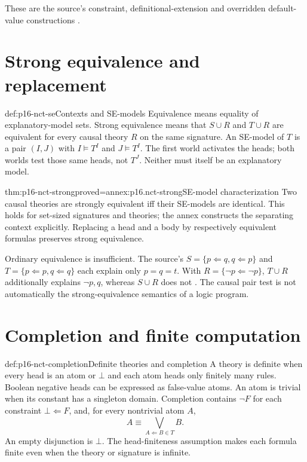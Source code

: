 These are the source's constraint, definitional-extension and overridden
default-value constructions \cite[pp.~763--765]{Turner2008NonmonotonicCausalLogic}.

\section{Strong equivalence and replacement}
\label{sec:p16-nct-strong-equivalence}

\begin{hbdefinition}{def:p16-nct-se}{Contexts and SE-models}
Equivalence means equality of explanatory-model sets.
Strong equivalence means that \(S\cup R\) and \(T\cup R\) are equivalent
for every causal theory \(R\) on the same signature.
An SE-model of \(T\) is a pair \((I,J)\) with
\(I\models T^I\) and \(J\models T^I\).
The first world activates the heads; both worlds test those same heads,
not \(T^J\). Neither must itself be an explanatory model.
\end{hbdefinition}

\begin{hbtheorem}{thm:p16-nct-strong}{proved=annex:p16.nct-strong}{SE-model characterization}
Two causal theories are strongly equivalent iff their SE-models are identical.
This holds for set-sized signatures and theories; the annex constructs the
separating context explicitly. Replacing a head and a body by respectively
equivalent formulas preserves strong equivalence.
\end{hbtheorem}

Ordinary equivalence is insufficient. The source's
\(S=\{p\Leftarrow q,q\Leftarrow p\}\) and
\(T=\{p\Leftarrow p,q\Leftarrow q\}\) each explain only \(p=q=t\).
With \(R=\{\neg p\Leftarrow\neg p\}\), \(T\cup R\) additionally explains
\(\neg p,q\), whereas \(S\cup R\) does not
\cite[pp.~765--766]{Turner2008NonmonotonicCausalLogic}.
The causal pair test is not automatically the strong-equivalence semantics
of a logic program.

\section{Completion and finite computation}
\label{sec:p16-nct-completion}

\begin{hbdefinition}{def:p16-nct-completion}{Definite theories and completion}
A theory is definite when every head is an atom or \(\bot\) and each atom
heads only finitely many rules. Boolean negative heads can be expressed as
false-value atoms. An atom is trivial when its constant has a singleton
domain. Completion contains \(\neg F\) for each constraint
\(\bot\Leftarrow F\), and, for every nontrivial atom \(A\),
\[
                  A\equiv\bigvee_{A\Leftarrow B\in T}B.
\]
An empty disjunction is \(\bot\). The head-finiteness assumption makes each
formula finite even when the theory or signature is infinite.
\end{hbdefinition}

